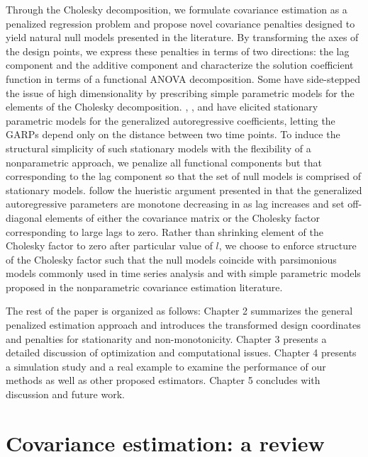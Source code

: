 \documentclass[12pt]{article}
\theoremstyle{definition}
\begin{document}
Through the Cholesky decomposition, we formulate covariance estimation as a penalized regression problem and propose novel covariance penalties designed to yield natural null models presented in the literature. By transforming the axes of the design points, we express these penalties in terms of two directions: the lag component and the additive component and characterize the solution coefficient function in terms of a functional ANOVA decomposition. Some have side-stepped the issue of high dimensionality by prescribing simple parametric models for the elements of the Cholesky decomposition.  \citet{chen2011efficient}, \citet{pourahmadi1999joint}, and \citet{pourahmadi2002dynamic} have elicited stationary parametric models for the generalized autoregressive coefficients, letting the GARPs depend only on the distance between two time points. To induce the structural simplicity of such stationary models with the flexibility of a nonparametric approach, we penalize all functional components but that corresponding to the lag component so that the set of null models is comprised of stationary models.  \citet{huang2007estimation} follow the hueristic argument presented in \citet{pourahmadi1999joint} that the generalized autoregressive parameters are monotone decreasing in as lag increases and set off-diagonal elements of either the covariance matrix or the Cholesky factor corresponding to large lags to zero. Rather than shrinking element of the Cholesky factor to zero after particular value of $l$, we choose to enforce structure of the Cholesky factor such that the null models coincide with parsimonious models commonly used in time series analysis and with simple parametric models proposed in the nonparametric covariance estimation literature.

\bigskip

The rest of the paper is organized as follows: Chapter 2 summarizes the general penalized estimation approach and introduces the transformed design coordinates and penalties for stationarity and non-monotonicity. Chapter 3 presents a detailed discussion of optimization and computational issues. Chapter 4 presents a simulation study and a real example to examine the performance of our methods as well as other proposed estimators. Chapter 5 concludes with discussion and future work.	

\section{Covariance estimation: a review}
\end{document}
